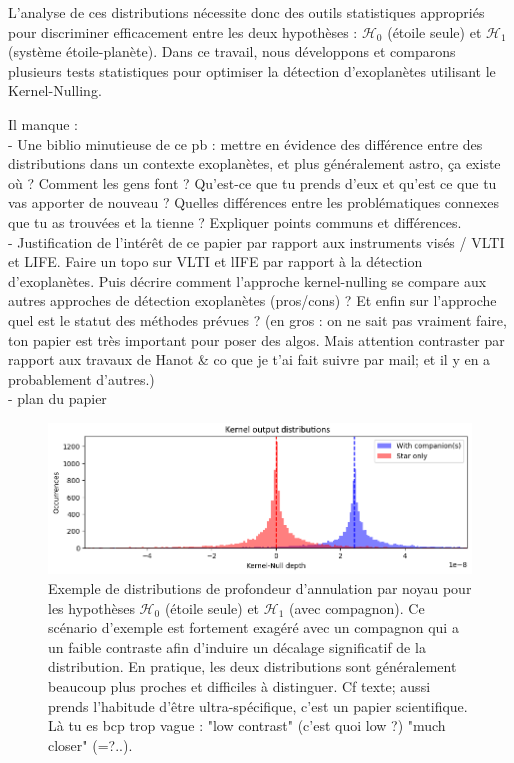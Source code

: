 \documentclass{article}
\newcommand{\dm}[1]{{\color{mulberry} #1}}
\begin{document}
L'analyse de ces distributions nécessite donc des outils statistiques appropriés pour discriminer efficacement entre les deux hypothèses : $\mathcal{H}_0$ (étoile seule) et $\mathcal{H}_1$ (système étoile-planète). Dans ce travail, nous développons et comparons plusieurs tests statistiques pour optimiser la détection d'exoplanètes utilisant le Kernel-Nulling.

\dm{Il manque :\\
- Une biblio minutieuse de ce pb : mettre en évidence des différence entre des distributions dans un contexte exoplanètes, et plus généralement astro, ça existe où ? Comment les gens font ? Qu'est-ce que tu prends d'eux et qu'est ce que tu vas apporter de nouveau ? Quelles différences entre les problématiques connexes que tu as trouvées et la tienne ? Expliquer points communs et différences.\\
- Justification de l'intérêt de ce papier par rapport aux instruments visés / VLTI et LIFE. Faire un topo sur VLTI et lIFE par rapport à la détection d'exoplanètes. Puis décrire comment l'approche kernel-nulling se compare aux autres approches de détection exoplanètes (pros/cons) ? Et enfin sur l'approche quel est le statut des méthodes prévues ? (en gros : on ne sait pas vraiment faire, ton papier est très important pour poser des algos. Mais attention contraster par rapport aux travaux de Hanot \& co que je t'ai fait suivre par mail; et il y en a probablement d'autres.)\\ 
- plan du papier}

\begin{figure}[H]
\centering
\includegraphics[width=\linewidth]{img/output_distribution.png}
\caption{Exemple de distributions de profondeur d'annulation par noyau pour les hypothèses $\mathcal{H}_0$ (étoile seule) et $\mathcal{H}_1$ (avec compagnon). Ce scénario d'exemple est fortement exagéré avec un compagnon qui a un faible contraste afin d'induire un décalage significatif de la distribution. En pratique, les deux distributions sont généralement beaucoup plus proches et difficiles à distinguer.\dm{Cf texte; aussi prends l'habitude d'être ultra-spécifique, c'est un papier scientifique. Là tu es bcp trop vague : "low contrast" (c'est quoi low ?) "much closer" (=?..)}.}
\label{fig:distribution}
\end{figure}
\end{document}
